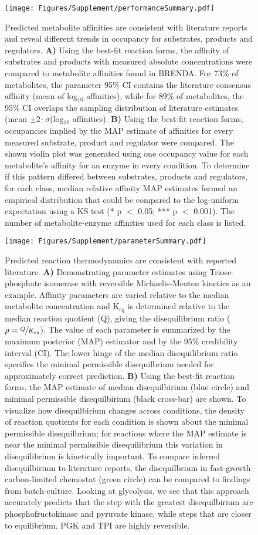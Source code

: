 \documentclass[12pt]{article}\usepackage{graphicx, color}
\begin{document}
\begin{figure}[h!]
\texttt{[image: Figures/Supplement/performanceSummary.pdf]}
\caption{Predicted metabolite affinities are consistent with literature reports and reveal different trends in occupancy for substrates, products and regulators. \textbf{A)} Using the best-fit reaction forms, the affinity of substrates and products with measured absolute concentrations were compared to metabolite affinities found in BRENDA.  For 73\% of metabolites, the parameter 95\% CI contains the literature consensus affinity (mean of log$_{10}$ affinities), while for 89\% of metabolites, the 95\% CI overlaps the sampling distribution of literature estimates (mean $\pm 2 \cdot \sigma$(log$_{10}$ affinities). \textbf{B)} Using the best-fit reaction forms, occupancies implied by the MAP estimate of affinities for every measured substrate, product and regulator were compared. The shown violin plot was generated using one occupancy value for each metabolite's affinity for an enzyme in every condition.  To determine if this pattern differed between substrates, products and regulators, for each class, median relative affinity MAP estimates formed an empirical distribution that could be compared to the log-uniform expectation using a KS test (* p $<$ 0.05; *** p $<$ 0.001). The number of metabolite-enzyme affinities used for each class is listed.}
\label{fig:occupancy}
\end{figure}

\begin{figure}[h!]
\texttt{[image: Figures/Supplement/parameterSummary.pdf]}
\caption{Predicted reaction thermodynamics are consistent with reported literature. \textbf{A)} Demonstrating parameter estimates using Triose-phosphate isomerase with reversible Michaelis-Menten kinetics as an example.  Affinity parameters are varied relative to the median metabolite concentration and K$_{eq}$ is determined relative to the median reaction quotient (Q), giving the disequilibrium ratio ($\rho = \sfrac{Q}{K_{eq}}$).  The value of each parameter is summarized by the maximum posterior (MAP) estimator and by the 95\% credibility interval (CI).  The lower hinge of the median disequilibrium ratio specifies the minimal permissible disequilbrium needed for approximately correct prediction.  \textbf{B)} Using the best-fit reaction forms, the MAP estimate of median disequilbirium (blue circle) and minimal permissible disequilbirium (black cross-bar) are shown.  To visualize how disequilbirium changes across conditions, the density of reaction quotients for each condition is shown about the minimal permissible disequilbrium; for reactions where the MAP estimate is near the minimal permissible disequilibrium this variation in disequilibrium is kinetically important.  To compare inferred disequilbirium to literature reports, the disequilbrium in fast-growth carbon-limited chemostat (green circle) can be compared to findings from batch-culture.  Looking at glycolysis, we see that this approach accurately predicts that the step with the greatest disequilbirium are phosphofructokinase and pyruvate kinase, while steps that are closer to equilibrium, PGK and TPI are highly reversible.}
\label{fig:paramaterValues}
\end{figure}
\end{document}
